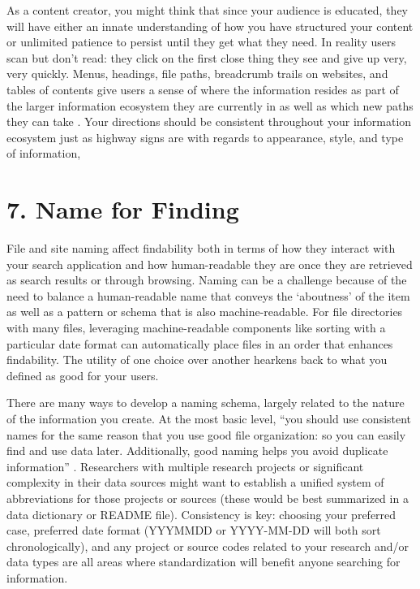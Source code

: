 \documentclass[10pt,letterpaper]{article}
\newcommand{\rulemajor}[1]{\section*{#1}}
\begin{document}
As a content creator, you might think that since your audience is educated, they
will have either an innate understanding of how you have structured your content
or unlimited patience to persist until they get what they need. In reality users
scan but don't read: they click on the first close thing they see and give up
very, very quickly. Menus, headings, file paths, breadcrumb trails on websites,
and tables of contents give users a sense of where the information resides as
part of the larger information ecosystem they are currently in as well as which
new paths they can take \cite{Krug2014}. Your directions should be consistent
throughout your information ecosystem just as highway signs are with regards to
appearance, style, and type of information,

\rulemajor{7. Name for Finding}

File and site naming affect findability both in terms of how they interact with
your search application and how human-readable they are once they are retrieved
as search results or through browsing. Naming can be a challenge because of the
need to balance a human-readable name that conveys the `aboutness' of the item
as well as a pattern or schema that is also machine-readable. For file
directories with many files, leveraging machine-readable components like sorting
with a particular date format can automatically place files in an order that
enhances findability. The utility of one choice over another hearkens back to
what you defined as good for your users.

There are many ways to develop a naming schema, largely related to the nature of
the information you create. At the most basic level, ``you should use consistent
names for the same reason that you use good file organization: so you can easily
find and use data later. Additionally, good naming helps you avoid duplicate
information'' \cite{Briney2015}. Researchers with multiple research projects or
significant complexity in their data sources might want to establish a unified
system of abbreviations for those projects or sources (these would be best
summarized in a data dictionary or README file). Consistency is key: choosing
your preferred case, preferred date format (YYYMMDD or YYYY-MM-DD will both sort
chronologically), and any project or source codes related to your research
and/or data types are all areas where standardization will benefit anyone
searching for information.
\end{document}
